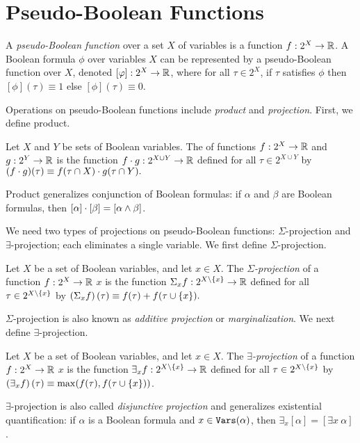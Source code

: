 \section{Pseudo-Boolean Functions}
A \emph{pseudo-Boolean function} over a set $X$ of variables is a function $f: 2^X \to \mathbb{R}$. A Boolean formula $\phi$ over variables $X$ can be represented by a pseudo-Boolean function over $X$, denoted $[\varphi]: 2^X \rightarrow \mathbb{R}$, where for all $\tau \in 2^X$, if $\tau$ satisfies $\phi$ then $[\phi](\tau) \equiv 1$ else $[\phi](\tau) \equiv 0$.

Operations on pseudo-Boolean functions include \emph{product} and \emph{projection}.
First, we define product.
\begin{definition}[Product]
\label{def_mult}
    Let $X$ and $Y$ be sets of Boolean variables.
    The  of functions $f: 2^X \to \mathbb{R}$ and $g: 2^Y \to \mathbb{R}$ is the function $f \cdot g: 2^{X \cup Y} \to \mathbb{R}$ defined for all $\tau \in 2^{X \cup Y}$ by
    $(f \cdot g)(\tau) \equiv f(\tau \cap X) \cdot g(\tau \cap Y).$
\end{definition}
Product generalizes conjunction of Boolean formulas: if $\alpha$ and $\beta$ are Boolean formulas, then $[\alpha] \cdot [\beta] = [\alpha \land \beta]$.

We need two types of projections on pseudo-Boolean functions: $\Sigma$-projection and $\exists$-projection; each eliminates a single variable. 
We first define $\Sigma$-projection.
\begin{definition}
\label{def_sum}
    Let $X$ be a set of Boolean variables, and let $x \in X$.
    The \emph{$\Sigma$-projection} of a function $f: 2^X \to \mathbb{R}$ \wrt{} $x$ is the function $\Sigma_x f: 2^{X \setminus \left\{ x \right\}} \to \mathbb{R}$ defined for all $\tau \in 2^{X \setminus \left\{ x \right\}}$ by
    $\left( \Sigma_x f \right)(\tau) \equiv f(\tau) + f(\tau \cup \left\{ x \right\}).$
\end{definition}
$\Sigma$-projection is also known as \emph{additive projection} or 
\emph{marginalization}.
We next define $\exists$-projection.
\begin{definition}
\label{def_exist}
    Let $X$ be a set of Boolean variables, and let $x \in X$.
    The \emph{$\exists$-projection} of a function $f: 2^X \to \mathbb{R}$ \wrt{} $x$ is the function $\exists_x f: 2^{X \setminus \left\{ x \right\}} \to \mathbb{R}$ defined for all $\tau \in 2^{X \setminus \left\{ x \right\}}$ by $\left( \exists_x f \right)(\tau) \equiv \max(f(\tau), f(\tau \cup \left\{ x \right\}))$.
\end{definition}
$\exists$-projection is also called \emph{disjunctive projection} and generalizes existential quantification: if $\alpha$ is a Boolean formula and $x \in \texttt{\upshape Vars}(\alpha)$, then $\exists_x [\alpha] = [\exists x ~ \alpha]$.

